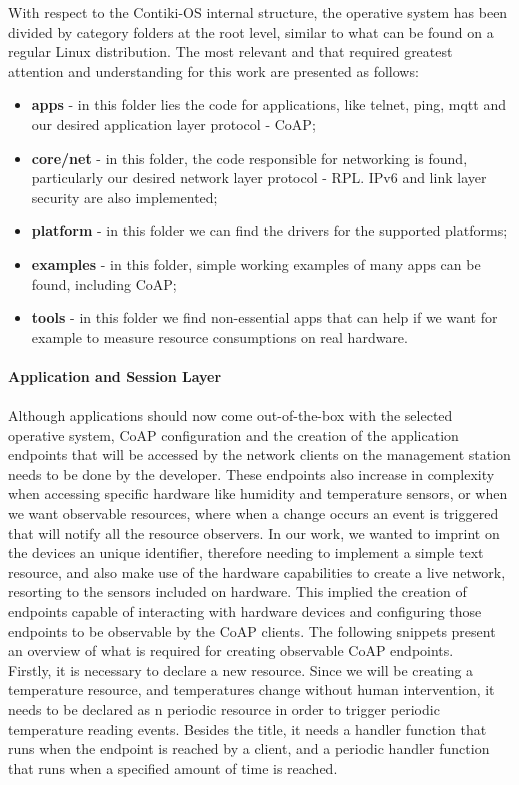 With respect to the Contiki-OS internal structure, the operative system has been divided by category folders at the root level, similar to what can be found on a regular Linux distribution. The most relevant and that required greatest attention and understanding for this work are presented as follows:

\begin{itemize}
	\item \textbf{apps} - in this folder lies the code for applications, like telnet, ping, mqtt and our desired application layer protocol - \gls{CoAP};
	\item \textbf{core/net} - in this folder, the code responsible for networking is found, particularly our desired network layer protocol - RPL. IPv6 and link layer security are also implemented;
	\item \textbf{platform} - in this folder we can find the drivers for the supported platforms;
	\item \textbf{examples} - in this folder, simple working examples of many apps can be found, including \gls{CoAP};
	\item \textbf{tools} - in this folder we find non-essential apps that can help if we want for example to measure resource consumptions on real hardware.
\end{itemize}

\paragraph{\textbf{Application and Session Layer}}
\paragraph{}

Although applications should now come out-of-the-box with the selected operative system, \gls{CoAP} configuration and the creation of the application endpoints that will be accessed by the network clients on the management station needs to be done by the developer. These endpoints also increase in complexity when accessing specific hardware like humidity and temperature sensors, or when we want observable resources, where when a change occurs an event is triggered that will notify all the resource observers. In our work, we wanted to imprint on the devices an unique identifier, therefore needing to implement a simple text resource, and also make use of the hardware capabilities to create a live network, resorting to the sensors included on hardware. This implied the creation of endpoints capable of interacting with hardware devices and configuring those endpoints to be observable by the \gls{CoAP} clients. The following snippets present an overview of what is required for creating observable \gls{CoAP} endpoints.\\
Firstly, it is necessary to declare a new resource. Since we will be creating a temperature resource, and temperatures change without human intervention, it needs to be declared as n periodic resource in order to trigger periodic temperature reading events. Besides the title, it needs a handler function that runs when the endpoint is reached by a client, and a periodic handler function that runs when a specified amount of time is reached.

